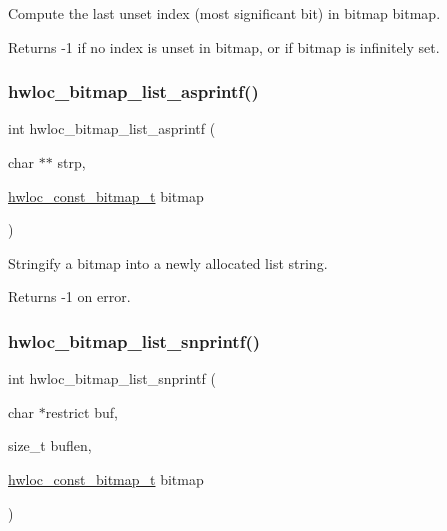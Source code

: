 Compute the last unset index (most significant bit) in bitmap {\ttfamily bitmap}. 

\begin{DoxyReturn}{Returns}
-\/1 if no index is unset in {\ttfamily bitmap}, or if {\ttfamily bitmap} is infinitely set. 
\end{DoxyReturn}
\mbox{\label{a00205_ga39c0f1b02053de66d205c9f8260b3665}} 
\subsubsection{\texorpdfstring{hwloc\+\_\+bitmap\+\_\+list\+\_\+asprintf()}{hwloc\_bitmap\_list\_asprintf()}}
{\footnotesize\ttfamily int hwloc\+\_\+bitmap\+\_\+list\+\_\+asprintf (\begin{DoxyParamCaption}\item[{char $\ast$$\ast$}]{strp,  }\item[{\hyperlink{a00205_gae991a108af01d408be2776c5b2c467b2}{hwloc\+\_\+const\+\_\+bitmap\+\_\+t}}]{bitmap }\end{DoxyParamCaption})}



Stringify a bitmap into a newly allocated list string. 

\begin{DoxyReturn}{Returns}
-\/1 on error. 
\end{DoxyReturn}
\mbox{\label{a00205_ga3d06e6447edeb61e56a9ad83f31f0a37}} 
\subsubsection{\texorpdfstring{hwloc\+\_\+bitmap\+\_\+list\+\_\+snprintf()}{hwloc\_bitmap\_list\_snprintf()}}
{\footnotesize\ttfamily int hwloc\+\_\+bitmap\+\_\+list\+\_\+snprintf (\begin{DoxyParamCaption}\item[{char $\ast$restrict}]{buf,  }\item[{size\+\_\+t}]{buflen,  }\item[{\hyperlink{a00205_gae991a108af01d408be2776c5b2c467b2}{hwloc\+\_\+const\+\_\+bitmap\+\_\+t}}]{bitmap }\end{DoxyParamCaption})}



